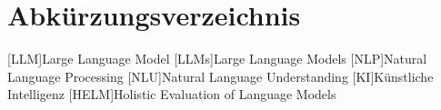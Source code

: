 \documentclass[a4paper, 12pt]{article}
\newcounter{lastromanpage}
\begin{document}

\newpage
{}
\tableofcontents
\newpage
\section*{Abkürzungsverzeichnis}
\begin{acronym}[BERT]
    [LLM]{Large Language Model}
    [LLMs]{Large Language Models}
    [NLP]{Natural Language Processing}
    [NLU]{Natural Language Understanding}
    [KI]{Künstliche Intelligenz}
    [HELM]{Holistic Evaluation of Language Models}
\end{acronym}
\newpage
\setcounter{lastromanpage}{\value{page}} %











\newpage
{}
\setcounter{page}{\value{lastromanpage}} %

\newpage
{} %
\printbibliography[title={Literaturverzeichnis}, heading=bibintoc]
\end{document}
